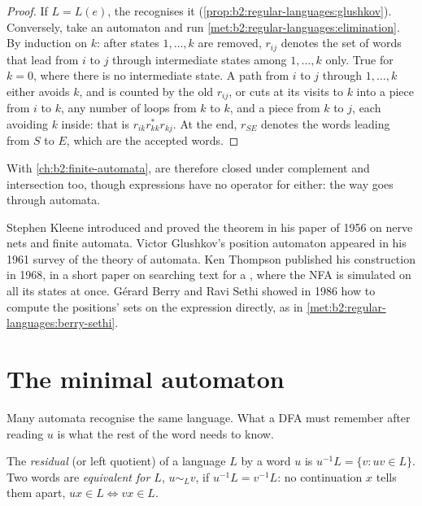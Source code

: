 \begin{proof}
If $L = L(e)$, the  recognises it (\cref{prop:b2:regular-languages:glushkov}). Conversely, take an
automaton and run \cref{met:b2:regular-languages:elimination}. By induction on $k$: after states $1, \dots, k$ are
removed, $r_{ij}$ denotes the set of words that lead from $i$ to $j$ through intermediate states among $1, \dots, k$
only. True for $k = 0$, where there is no intermediate state. A path from $i$ to $j$ through $1, \dots, k$ either avoids
$k$, and is counted by the old $r_{ij}$, or cuts at its visits to $k$ into a piece from $i$ to $k$, any number of loops
from $k$ to $k$, and a piece from $k$ to $j$, each avoiding $k$ inside: that is $r_{ik} r_{kk}^* r_{kj}$. At the end,
$r_{SE}$ denotes the words leading from $S$ to $E$, which are the accepted words.
\end{proof}

With \cref{ch:b2:finite-automata},  are therefore closed under complement and intersection too,
though expressions have no operator for either: the way goes through automata.

\begin{history}
Stephen Kleene introduced  and proved the theorem in his paper of 1956 on nerve nets and finite
automata. Victor Glushkov's position automaton appeared in his 1961 survey of the theory of automata. Ken Thompson
published his construction in 1968, in a short paper on searching text for a , where the NFA is
simulated on all its states at once. Gérard Berry and Ravi Sethi showed in
1986 how to compute the positions' sets on the expression directly, as in \cref{met:b2:regular-languages:berry-sethi}.
\end{history}

\section{The minimal automaton}\label{sec:b2:regular-languages:minimal}

Many automata recognise the same language. What a DFA must remember after reading $u$ is what the rest of the word
needs to know.

\begin{definition}\label{def:b2:regular-languages:residual}
The \emph{residual} (or left quotient) of a language $L$ by a word $u$ is $u^{-1}L = \{v :
uv \in L\}$. Two words are \emph{equivalent for $L$}, $u \sim_L v$, if $u^{-1}L =
v^{-1}L$: no continuation $x$ tells them apart, $ux \in L \iff vx \in L$.
\end{definition}


